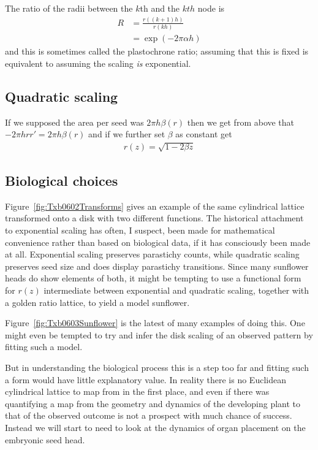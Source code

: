 The ratio of the radii between the $k$th and the $kth$ node is 
\begin{align}
R &= \frac{r((k+1) h)}{ r(kh)} 
\\
&= \exp (-2 \pi \alpha h) \label{eq:plastoratio}
\end{align}
and this is sometimes called the plastochrone ratio; assuming that this is fixed is equivalent to assuming the scaling \textit{is} exponential. 



\subsection{Quadratic scaling}
 If we supposed the area per seed was $2 \pi h \beta (r)$ then we get from above that $-2\pi h  r r'=2\pi h \beta (r)$ and if we further set $\beta$ as constant get
\begin{align}
	r(z) = \sqrt{ 1- 2\beta z } 
\end{align}
 
\clearpage


\subsection{Biological choices}
 Figure~\ref{fig:Txb0602Transforms} gives an example of the same cylindrical lattice transformed onto a disk with two different functions.
The historical attachment to exponential scaling has often, I suspect, been made for mathematical convenience rather than based on biological data, if it has consciously been made at all. Exponential scaling   preserves parastichy counts, while quadratic scaling preserves seed size and does display parastichy transitions. Since many sunflower heads do show elements of both, it might be tempting to use a functional form for $r(z)$ intermediate between exponential and quadratic scaling, together with a golden ratio lattice, to yield a model sunflower. 

Figure~\ref{fig:Txb0603Sunflower} is the latest of many examples of doing this. One might even be tempted to try and infer the disk scaling of an observed pattern by fitting such a model. 

But in understanding the biological process this is a step too far and fitting such a form would have little explanatory value. In  reality there is no Euclidean cylindrical lattice to map from in the first place, and even if there was quantifying a map from the geometry and dynamics of the developing plant to that of the observed outcome is not a prospect with much chance of success. Instead we will start to need to look at the dynamics of organ placement on the embryonic seed head.  

